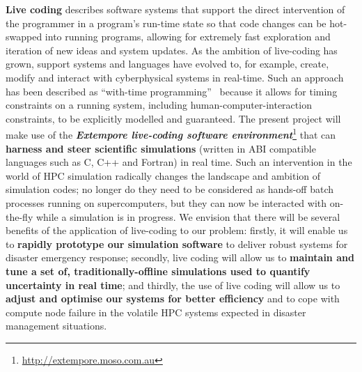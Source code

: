 {\bf Live coding} describes software systems that support the direct
intervention of the programmer in a program’s run-time state so that 
code changes can be 
hot-swapped into running programs, allowing for extremely fast
exploration and iteration of new ideas and system updates. As the
ambition of live-coding has grown, support systems and languages have
evolved to, for example, create, modify and interact with
cyberphysical systems in real-time. Such an approach has been
described as ``with-time
programming''~\parencite{sorensen2010programming} because it allows
for timing constraints on a running system, including
human-computer-interaction constraints, to be explicitly modelled and
guaranteed. The present project will make use of the {\em\bf Extempore
  live-coding software
  environment}\footnote{\url{http://extempore.moso.com.au}} that can
{\bf harness and steer scientific simulations} (written in ABI compatible
languages such as C, C++ and Fortran) in real time. Such an intervention in
the world of HPC simulation radically changes
the landscape and ambition of simulation codes; no longer do they need
to be considered as hands-off batch processes running on
supercomputers, but they can now be interacted with on-the-fly while a
simulation is in progress. We envision that there will be several
benefits of the application of live-coding to our problem: firstly, it
will enable us to {\bf rapidly prototype our simulation software}  to
deliver robust systems for
disaster emergency response; secondly, live coding will allow us to
{\bf maintain and tune a set of, traditionally-offline simulations used to
quantify uncertainty in real time}; and thirdly, the use of live coding
will allow us to {\bf adjust and optimise our systems for better efficiency} and to cope 
with compute node failure in  the volatile HPC
systems expected in disaster management situations.

\iffalse
Computational decision support systems for disaster management have
existed for many decades \parencite{wallaceDecision1985}, and
advances have been made both in incorporating
uncertainty \parencite{thompsonSocial2014,nealeNavigating2015}
and providing real-time interaction and
output~\parencite{yuSupport2006}. More recently, mixed-reality game
scenarios have been used to understand and optimise human-agent
collaboration for disaster response~\parencite{ramchurn2016human}. In
our project plan we will follow a similar approach and will employ
mock-game scenarios to examine and understand the nature of decision
making with expert modelling support. In a novel twist, we will run
these games together with live-coding optimisation and tuning of the
software system and the underlying computational platform. By
analysing the protocols of these live optimisations, we will
accumulate data to feed into redesign of the software interface and to
understand the time requirements and controls needed for the
computational platform.
\fi


